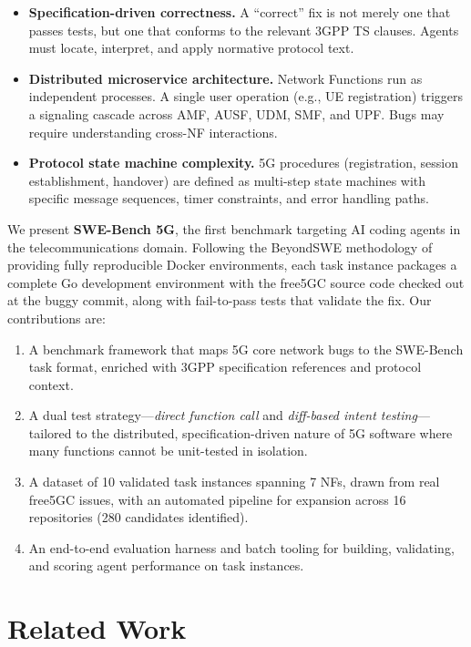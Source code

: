 \documentclass{article}
\begin{document}
\begin{itemize}
    \item \textbf{Specification-driven correctness.} A ``correct'' fix is not merely one that passes tests, but one that conforms to the relevant 3GPP TS clauses. Agents must locate, interpret, and apply normative protocol text.
    \item \textbf{Distributed microservice architecture.} Network Functions run as independent processes. A single user operation (e.g., UE registration) triggers a signaling cascade across AMF, AUSF, UDM, SMF, and UPF. Bugs may require understanding cross-NF interactions.
    \item \textbf{Protocol state machine complexity.} 5G procedures (registration, session establishment, handover) are defined as multi-step state machines with specific message sequences, timer constraints, and error handling paths.
\end{itemize}

We present \textbf{SWE-Bench 5G}, the first benchmark targeting AI coding agents in the telecommunications domain. Following the BeyondSWE methodology of providing fully reproducible Docker environments, each task instance packages a complete Go development environment with the free5GC source code checked out at the buggy commit, along with fail-to-pass tests that validate the fix. Our contributions are:

\begin{enumerate}
    \item A benchmark framework that maps 5G core network bugs to the SWE-Bench task format, enriched with 3GPP specification references and protocol context.
    \item A dual test strategy---\emph{direct function call} and \emph{diff-based intent testing}---tailored to the distributed, specification-driven nature of 5G software where many functions cannot be unit-tested in isolation.
    \item A dataset of 10 validated task instances spanning 7 NFs, drawn from real free5GC issues, with an automated pipeline for expansion across 16 repositories (280 candidates identified).
    \item An end-to-end evaluation harness and batch tooling for building, validating, and scoring agent performance on task instances.
\end{enumerate}

\section{Related Work}
\end{document}
